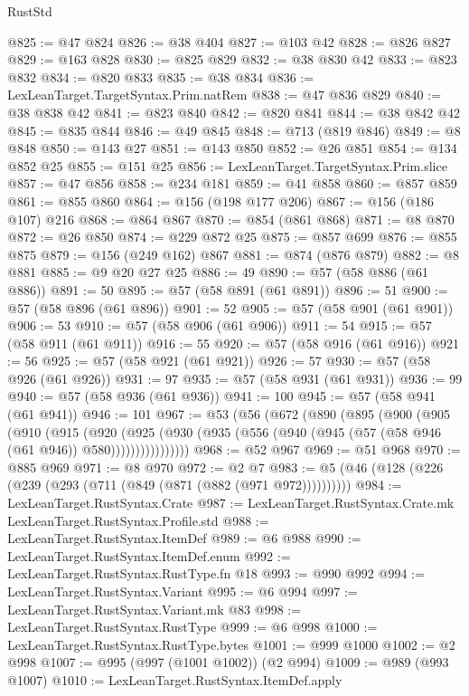 \begin{lexlean}{RustStd}
\begin{coremodule}
@825 := @47 @824
@826 := @38 @404
@827 := @103 @42
@828 := @826 @827
@829 := @163 @828
@830 := @825 @829
@832 := @38 @830 @42
@833 := @823 @832
@834 := @820 @833
@835 := @38 @834
@836 := LexLeanTarget.TargetSyntax.Prim.natRem
@838 := @47 @836 @829
@840 := @38 @838 @42
@841 := @823 @840
@842 := @820 @841
@844 := @38 @842 @42
@845 := @835 @844
@846 := @49 @845
@848 := @713 (@819 @846)
@849 := @8 @848
@850 := @143 @27
@851 := @143 @850
@852 := @26 @851
@854 := @134 @852 @25
@855 := @151 @25
@856 := LexLeanTarget.TargetSyntax.Prim.slice
@857 := @47 @856
@858 := @234 @181
@859 := @41 @858
@860 := @857 @859
@861 := @855 @860
@864 := @156 (@198 @177 @206)
@867 := @156 (@186 @107) @216
@868 := @864 @867
@870 := @854 (@861 @868)
@871 := @8 @870
@872 := @26 @850
@874 := @229 @872 @25
@875 := @857 @699
@876 := @855 @875
@879 := @156 (@249 @162) @867
@881 := @874 (@876 @879)
@882 := @8 @881
@885 := @9 @20 @27 @25
@886 := 49
@890 := @57 (@58 @886 (@61 @886))
@891 := 50
@895 := @57 (@58 @891 (@61 @891))
@896 := 51
@900 := @57 (@58 @896 (@61 @896))
@901 := 52
@905 := @57 (@58 @901 (@61 @901))
@906 := 53
@910 := @57 (@58 @906 (@61 @906))
@911 := 54
@915 := @57 (@58 @911 (@61 @911))
@916 := 55
@920 := @57 (@58 @916 (@61 @916))
@921 := 56
@925 := @57 (@58 @921 (@61 @921))
@926 := 57
@930 := @57 (@58 @926 (@61 @926))
@931 := 97
@935 := @57 (@58 @931 (@61 @931))
@936 := 99
@940 := @57 (@58 @936 (@61 @936))
@941 := 100
@945 := @57 (@58 @941 (@61 @941))
@946 := 101
@967 := @53
    (@56
      (@672
        (@890
          (@895
            (@900
              (@905
                (@910
                  (@915
                    (@920
                      (@925
                        (@930
                          (@935 (@556 (@940 (@945 (@57 (@58 @946 (@61 @946)) @580))))))))))))))))
@968 := @52 @967
@969 := @51 @968
@970 := @885 @969
@971 := @8 @970
@972 := @2 @7
@983 := @5 (@46 (@128 (@226 (@239 (@293 (@711 (@849 (@871 (@882 (@971 @972))))))))))
@984 := LexLeanTarget.RustSyntax.Crate
@987 := LexLeanTarget.RustSyntax.Crate.mk LexLeanTarget.RustSyntax.Profile.std
@988 := LexLeanTarget.RustSyntax.ItemDef
@989 := @6 @988
@990 := LexLeanTarget.RustSyntax.ItemDef.enum
@992 := LexLeanTarget.RustSyntax.RustType.fn @18
@993 := @990 @992
@994 := LexLeanTarget.RustSyntax.Variant
@995 := @6 @994
@997 := LexLeanTarget.RustSyntax.Variant.mk @83
@998 := LexLeanTarget.RustSyntax.RustType
@999 := @6 @998
@1000 := LexLeanTarget.RustSyntax.RustType.bytes
@1001 := @999 @1000
@1002 := @2 @998
@1007 := @995 (@997 (@1001 @1002)) (@2 @994)
@1009 := @989 (@993 @1007)
@1010 := LexLeanTarget.RustSyntax.ItemDef.apply

\end{coremodule}
\end{lexlean}
